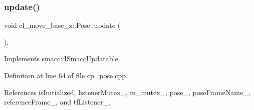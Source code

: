 \subsubsection{\texorpdfstring{update()}{update()}}
{\footnotesize\ttfamily void cl\+\_\+move\+\_\+base\+\_\+z\+::\+Pose\+::update (\begin{DoxyParamCaption}{ }\end{DoxyParamCaption})\hspace{0.3cm}{\ttfamily [override]}, {\ttfamily [virtual]}}



Implements \hyperlink{classsmacc_1_1ISmaccUpdatable_a84ee0520cbefdb1d412bed54650b028e}{smacc\+::\+I\+Smacc\+Updatable}.



Definition at line 64 of file cp\+\_\+pose.\+cpp.



References is\+Initialized, listener\+Mutex\+\_\+, m\+\_\+mutex\+\_\+, pose\+\_\+, pose\+Frame\+Name\+\_\+, reference\+Frame\+\_\+, and tf\+Listener\+\_\+.


